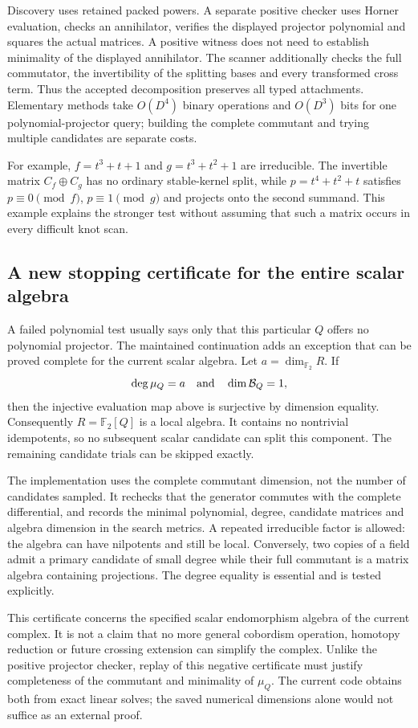 Discovery uses retained packed powers. A separate positive checker uses
Horner evaluation, checks an annihilator, verifies the displayed projector
polynomial and squares the actual matrices. A positive witness does not need
to establish minimality of the displayed annihilator. The scanner additionally
checks the full commutator, the invertibility of the splitting bases and every
transformed cross term. Thus the accepted decomposition preserves all typed
attachments. Elementary methods take $O(D^4)$ binary operations and $O(D^3)$
bits for one polynomial-projector query; building the complete commutant and
trying multiple candidates are separate costs.

For example, $f=t^3+t+1$ and $g=t^3+t^2+1$ are irreducible. The invertible
matrix $C_f\oplus C_g$ has no ordinary stable-kernel split, while
$p=t^4+t^2+t$ satisfies $p\equiv0\pmod f$, $p\equiv1\pmod g$ and projects
onto the second summand. This example explains the stronger test without
assuming that such a matrix occurs in every difficult knot scan.

\subsection{A new stopping certificate for the entire scalar algebra}
A failed polynomial test usually says only that this particular $Q$ offers
no polynomial projector. The maintained continuation adds an exception that
can be proved complete for the current scalar algebra. Let
$a=\dim_{\mathbb F_2}R$. If
\[
 \deg\mu_Q=a\quad\hbox{and}\quad\dim\mathcal B_Q=1,
\]
then the injective evaluation map above is surjective by dimension equality.
Consequently $R=\mathbb F_2[Q]$ is a local algebra. It contains no nontrivial
idempotents, so no subsequent scalar candidate can split this component.
The remaining candidate trials can be skipped exactly.

The implementation uses the complete commutant dimension, not the number of
candidates sampled. It rechecks that the generator commutes with the complete
differential, and records the minimal polynomial, degree, candidate matrices
and algebra dimension in the search metrics. A repeated irreducible factor
is allowed: the algebra can have nilpotents and still be local. Conversely,
two copies of a field admit a primary candidate of small degree while their
full commutant is a matrix algebra containing projections. The degree equality
is essential and is tested explicitly.

This certificate concerns the specified scalar endomorphism algebra of the
current complex. It is not a claim that no more general cobordism operation,
homotopy reduction or future crossing extension can simplify the complex.
Unlike the positive projector checker, replay of this negative certificate
must justify completeness of the commutant and minimality of $\mu_Q$.
The current code obtains both from exact linear solves; the saved numerical
dimensions alone would not suffice as an external proof.

